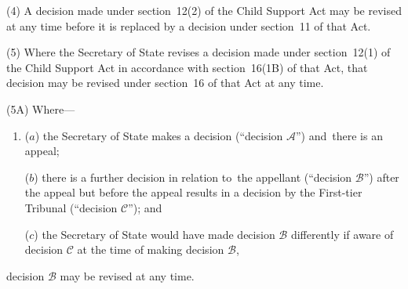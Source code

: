 \documentclass[12pt,a4paper]{article}
\begin{document}
(4) A decision made under section~12(2) of the Child Support Act may be revised at any time before it is replaced by a decision under section~11 of that Act.

(5) Where the 
Secretary of State  %
revises a decision made under section~12(1) of the Child Support Act in accordance with section~16(1B) of that Act, that decision may be revised under section~16 of that Act at any time.

(5A) Where—
\begin{enumerate}\item[]
($a$) the 
Secretary of State  %
makes a decision (“decision $\mathcal{A}$”) and~there is an appeal;

($b$) there is a further decision in relation to~the appellant (“decision $\mathcal{B}$”) after the appeal but before the appeal results in a decision by 
the First-tier Tribunal  %
(“decision $\mathcal{C}$”); and

($c$) the 
Secretary of State  %
would have made decision $\mathcal{B}$ differently if 
aware of decision $\mathcal{C}$ at the time 
of making  %
decision $\mathcal{B}$,
\end{enumerate}
decision $\mathcal{B}$ may be revised at any time.

%
%
\end{document}
